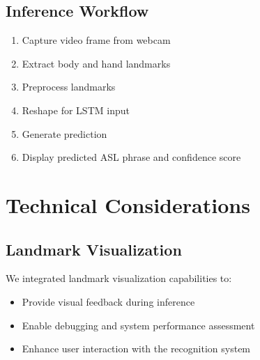 \subsection{Inference Workflow}
\begin{enumerate}
\item Capture video frame from webcam
\item Extract body and hand landmarks
\item Preprocess landmarks
\item Reshape for LSTM input
\item Generate prediction
\item Display predicted ASL phrase and confidence score
\end{enumerate}

\section{Technical Considerations}

\subsection{Landmark Visualization}
We integrated landmark visualization capabilities to:
\begin{itemize}
\item Provide visual feedback during inference
\item Enable debugging and system performance assessment
\item Enhance user interaction with the recognition system
\end{itemize}
